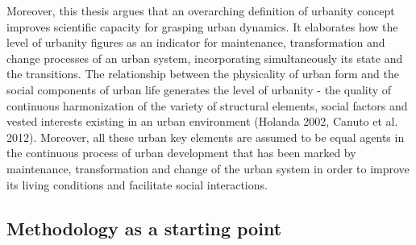 \documentclass[11pt]{report}
\begin{document}
Moreover, this thesis argues that an overarching definition of urbanity concept improves scientific capacity for grasping urban dynamics. It elaborates how the level of urbanity figures as an indicator for maintenance, transformation and change processes of an urban system, incorporating simultaneously its state and the transitions. The relationship between the physicality of urban form and the social components of urban life generates the level of urbanity - the quality of continuous harmonization of the variety of structural elements, social factors and vested interests existing in an urban environment (Holanda 2002, Canuto et al. 2012). Moreover, all these urban key elements are assumed to be equal agents in the continuous process of urban development that has been marked by maintenance, transformation and change of the urban system in order to improve its living conditions and facilitate social interactions.

\subsection{Methodology as a starting point}
\end{document}
